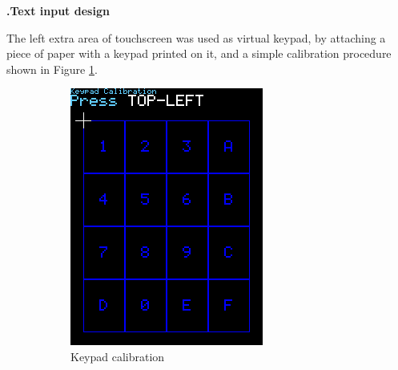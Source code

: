 \documentclass[a4paper,notitlepage,10pt]{report}
\newcommand{\tab}{\hspace{0.75cm}}
\newcommand{\fontSubHeading}{\fontsize{10pt}{11pt}\selectfont}
\newcounter{sections}
\newcounter{subsections}[sections]
\begin{document}
\begin{multicols}{2}
\fontSubHeading
{}
\textbf{\thesections.\thesubsections\tab Text input design}
\vspace{6pt}

The left extra area of touchscreen was used as virtual keypad, by attaching a piece of paper with a keypad printed on it, and a simple calibration procedure shown in Figure \ref{fig:capKPCAL}.
\vspace{6pt}

\begin{figure}[H]
	\centering
	\begin{subfigure}[b]{0.4\columnwidth}
		\includegraphics[width=\textwidth]{cap_kp_cal}
		\caption{Keypad calibration}
		\label{fig:capKPCAL}
	\end{subfigure}
	\begin{subfigure}[b]{0.4\columnwidth}

\end{subfigure}
\end{figure}
\end{multicols}
\end{document}

